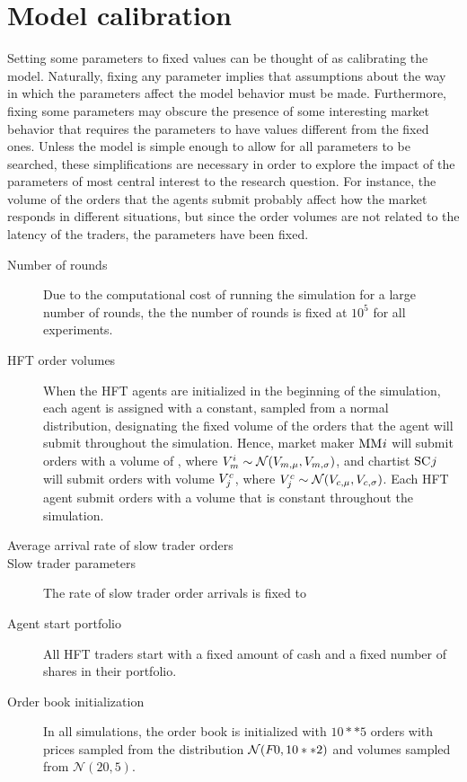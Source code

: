 \begin{description}
\end{description}



\section{Model calibration}
Setting some parameters to fixed values can be thought of as calibrating the model. Naturally, fixing any parameter implies that assumptions about the way in which the parameters affect the model behavior must be made. Furthermore, fixing some parameters may obscure the presence of some interesting market behavior that requires the parameters to have values different from the fixed ones. Unless the model is simple enough to allow for all parameters to be searched, these simplifications are necessary in order to explore the impact of the parameters of most central interest to the research question. For instance, the volume of the orders that the agents submit probably affect how the market responds in different situations, but since the order volumes are not related to the latency of the traders, the parameters have been fixed. 
\begin{description}
	\item [Number of rounds] Due to the computational cost of running the simulation for a large number of rounds, the the number of rounds is fixed at $10^5$ for all experiments.
	\item [HFT order volumes] When the HFT agents are initialized in the beginning of the simulation, each agent is assigned with a constant, sampled from a normal distribution, designating the fixed volume of the orders that the agent will submit throughout the simulation. Hence, market maker $\text{MM}_{}{i}$ will submit orders with a volume of , where $V_m^{i} \sim \mathcal{N}(V_{m,\mu}, V_{m,\sigma})$, and chartist $\text{SC}_{}{j}$ will submit orders with volume $V^c_{j}$, where $V^c_{j} \sim \mathcal{N}(V_{c, \mu}, V_{c, \sigma})$.
	Each HFT agent submit orders with a volume that is constant throughout the simulation. 
	\item[Average arrival rate of slow trader orders]
	\item[Slow trader parameters] The rate of slow trader order arrivals is fixed to 
	\item[Agent start portfolio] All HFT traders start with a fixed amount of cash and a fixed number of shares in their portfolio. 
	\item[Order book initialization] In all simulations, the order book is initialized with $10**5 $ orders with prices sampled from the distribution $\mathcal{N}(F_{}{0}, 10**2)$ and volumes sampled  from $\mathcal{N}(20, 5)$.
\end{description}

